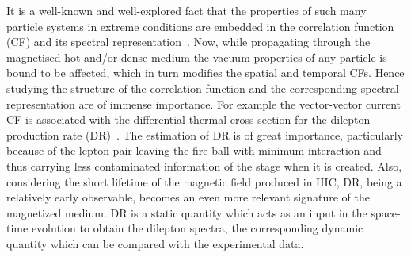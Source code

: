 \documentclass[aps,prd,floatfix,showpacs,showkeys,superscriptadress,unsortedaddress,nofootinbib,onecolumn]{revtex4-1}
\begin{document}
It is a well-known and well-explored fact that the properties of such many particle systems in extreme conditions are embedded in the correlation function (CF) and its spectral representation~\cite{Forster:1975pm,Callen:1951vq,Kubo:1957mj}. Now, while propagating through the magnetised hot and/or dense medium the vacuum properties of any particle is bound to be affected, which in turn modifies the spatial and temporal CFs. Hence studying the structure of the correlation function and the corresponding spectral representation are of immense importance. For example the vector-vector current CF is associated with the differential thermal cross section for the dilepton production rate (DR)~\cite{Weldon:1990iw}. The estimation of DR is of great importance, particularly because of the lepton pair leaving the fire ball with minimum interaction and thus carrying less contaminated information of the stage when it is created. Also, considering the short lifetime of the magnetic field produced in HIC, DR, being a relatively early observable, becomes an even more relevant signature of the magnetized medium. DR is a static quantity which acts as an input in the space-time evolution to obtain the dilepton spectra, the corresponding dynamic quantity which can be compared with the experimental data.
\end{document}
